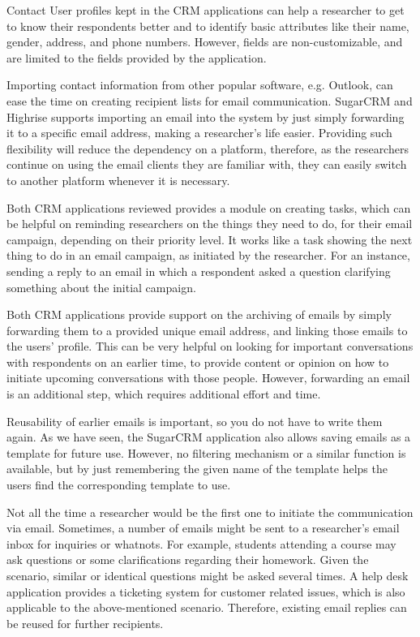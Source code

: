 \begin{compactitem}
	\item Contact User profiles kept in the \ac{CRM} applications can help a researcher to get to know their respondents better and to identify basic attributes like their name, gender, address, and phone numbers. However, fields are non-customizable, and are limited to the fields provided by the application.
	\item Importing contact information from other popular software, e.g. Outlook, can ease the time on creating recipient lists for email communication. SugarCRM and Highrise supports importing an email into the system by just simply forwarding it to a specific email address, making a researcher's life easier. Providing such flexibility will reduce the dependency on a platform, therefore, as the researchers continue on using the email clients they are familiar with, they can easily switch to another platform whenever it is necessary.
	\item Both \ac{CRM} applications reviewed provides a module on creating tasks, which can be helpful on reminding researchers on the things they need to do, for their email campaign, depending on their priority level. It works like a task showing the next thing to do in an email campaign, as initiated by the researcher. For an instance, sending a reply to an email in which a respondent asked a question clarifying something about the initial campaign.
	\item Both \ac{CRM} applications provide support on the archiving of emails by simply forwarding them to a provided unique email address, and linking those emails to the users' profile. This can be very helpful on looking for important conversations with respondents on an earlier time, to provide content or opinion on how to initiate upcoming conversations with those people. However, forwarding an email is an additional step, which requires additional effort and time.
	\item Reusability of earlier emails is important, so you do not have to write them again. As we have seen, the SugarCRM application also allows saving emails as a template for future use. However, no filtering mechanism or a similar function is available, but by just remembering the given name of the template helps the users find the corresponding template to use.
	\item Not all the time a researcher would be the first one to initiate the communication via email. Sometimes, a number of emails might be sent to a researcher's email inbox for inquiries or whatnots. For example, students attending a course may ask questions or some clarifications regarding their homework. Given the scenario, similar or identical questions might be asked several times. A help desk application provides a ticketing system for customer related issues, which is also applicable to the above-mentioned scenario. Therefore, existing email replies can be reused for further recipients.

\end{compactitem}
